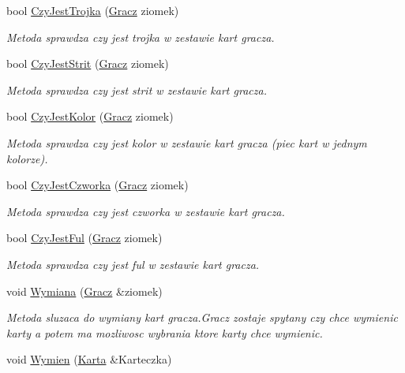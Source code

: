 \begin{DoxyCompactItemize}
bool \hyperlink{class_g_r_a_ab62696649e029ba3adc5876dee3c8fbc}{Czy\-Jest\-Trojka} (\hyperlink{class_gracz}{Gracz} ziomek)
\begin{DoxyCompactList}\small\item\em Metoda sprawdza czy jest trojka w zestawie kart gracza. \end{DoxyCompactList}\item 
bool \hyperlink{class_g_r_a_a3fb6dbd37229ac58c84a0b4f5403a3d6}{Czy\-Jest\-Strit} (\hyperlink{class_gracz}{Gracz} ziomek)
\begin{DoxyCompactList}\small\item\em Metoda sprawdza czy jest strit w zestawie kart gracza. \end{DoxyCompactList}\item 
bool \hyperlink{class_g_r_a_a04dd210d0146656fd70e2d10ccdf0065}{Czy\-Jest\-Kolor} (\hyperlink{class_gracz}{Gracz} ziomek)
\begin{DoxyCompactList}\small\item\em Metoda sprawdza czy jest kolor w zestawie kart gracza (piec kart w jednym kolorze). \end{DoxyCompactList}\item 
bool \hyperlink{class_g_r_a_a1be2bb0326db17fde5861adb676224fb}{Czy\-Jest\-Czworka} (\hyperlink{class_gracz}{Gracz} ziomek)
\begin{DoxyCompactList}\small\item\em Metoda sprawdza czy jest czworka w zestawie kart gracza. \end{DoxyCompactList}\item 
bool \hyperlink{class_g_r_a_a4d6b5d423f0f4761d04bbb59325417fd}{Czy\-Jest\-Ful} (\hyperlink{class_gracz}{Gracz} ziomek)
\begin{DoxyCompactList}\small\item\em Metoda sprawdza czy jest ful w zestawie kart gracza. \end{DoxyCompactList}\item 
void \hyperlink{class_g_r_a_a4ffb4d5d97261a8cd2220a6b59616bb6}{Wymiana} (\hyperlink{class_gracz}{Gracz} \&ziomek)
\begin{DoxyCompactList}\small\item\em Metoda sluzaca do wymiany kart gracza.\-Gracz zostaje spytany czy chce wymienic karty a potem ma mozliwosc wybrania ktore karty chce wymienic. \end{DoxyCompactList}\item 
void \hyperlink{class_g_r_a_a99c72e824c90f1bdbb34626e67d83c15}{Wymien} (\hyperlink{class_karta}{Karta} \&Karteczka)

\end{DoxyCompactItemize}
